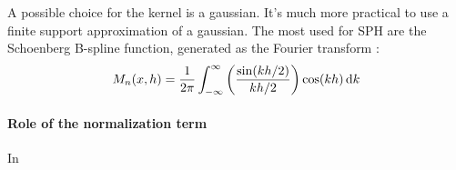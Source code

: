 A possible choice for the kernel is a gaussian.
It's much more practical to use a finite support approximation of a gaussian.
The most used for SPH are the Schoenberg \cite{} B-spline function, generated as the Fourier transform \citep{Price2012}:
\begin{equation}
M_n(x, h) = \frac{1}{2\pi}\int_{-\infty}^{\infty}{\left(\frac{\sin(kh/2)}{kh/2}\right)\cos(kh)\operatorname{d}\!{k}}
\end{equation}





\paragraph{Role of the normalization term}

In 
